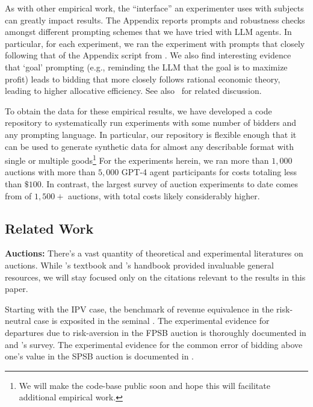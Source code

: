 \documentclass{article} %
\begin{document}
As with other empirical work, the ``interface'' an experimenter uses with subjects can greatly impact results. The Appendix reports prompts and robustness checks amongst different prompting schemes that we have tried with LLM agents. In particular, for each experiment, we ran the experiment with prompts that closely following that of the Appendix script from \cite{li2017obviously}.
 We also find interesting evidence that `goal' prompting (e.g., reminding the LLM that the goal is to maximize profit) leads to bidding that more closely follows rational economic theory, leading to higher allocative efficiency. See also~\cite{manning2024automated} for related discussion. 

To obtain the data for these empirical results, we have developed a code repository to systematically run experiments 
with some number of bidders
and any prompting language. In particular, our repository is flexible enough that it can be used to generate synthetic data for almost any describable format with single or multiple goods\footnote{We will make the code-base public soon and hope this will facilitate additional empirical work.}
%
For the experiments herein, we ran more than $1,000$ auctions with more than $5,000$ GPT-4 agent participants for costs totaling less than $\$100$. In contrast, the largest survey of auction experiments to date comes from \citet{cox1986controlled} of $1,500+$ auctions, with total costs likely considerably higher.

\subsection{Related Work}




\textbf{Auctions:}
There's a vast quantity of theoretical and experimental literatures on auctions. While \cite{krishna2009auction}'s textbook and \citet{kagel2020handbook}'s handbook provided invaluable general resources, we will stay focused only on the citations relevant to the results in this paper.

Starting with the IPV case, the benchmark of revenue equivalence in the risk-neutral case is exposited in the seminal 
\citet{myerson1981optimal}. The experimental evidence for departures due to risk-aversion in the FPSB auction is thoroughly documented in \citet{coppinger1980incentives} and \citet{cox1986controlled}'s survey. The experimental evidence for the common error of bidding above one's value in the SPSB auction is documented in \citet{kagel1993independent}.
\end{document}
